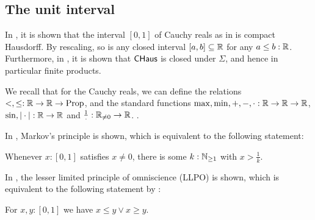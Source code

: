 \subsection{The unit interval}
\begin{example}
  In \parencite[Thm 4.22]{synthetic-stone-duality}, it is shown that the interval $[0,1]$ of Cauchy reals as in \cite{Bishop} is compact Hausdorff. By rescaling, so is any closed interval $[a,b]\subseteq \mathbb{R}$ for any $a\leq b:\mathbb{R}$. Furthermore, in \parencite[Lemma 4.11]{synthetic-stone-duality}, it is shown that $\mathsf{CHaus}$ is closed under $\Sigma$, and hence in particular finite products. 
\end{example}
\begin{remark}\label{CauchyDfns}
  We recall that for the Cauchy reals, we can define the relations $<,\leq : \mathbb{R} \to \mathbb{R} \to \mathrm{Prop}$, and the standard functions 
 $\max,\min,+,-,\cdot : \mathbb{R} \to \mathbb{R} \to \mathbb{R}$,
  $\sin,|\cdot|:\mathbb{R} \to \mathbb{R}$ and 
  $\frac{1}{\cdot}:\mathbb{R}_{\neq 0} \to \mathbb{R}$.
  \parencite[Dfn 2.4, Dfn 2.7,Dfn 2.10, Prop 2.13, p20,p58]{Bishop}.
\end{remark}

  In \parencite[Cor 1.16]{synthetic-stone-duality}, Markov's principle is shown, which is equivalent to the following statement:
\begin{lemma}\label{positiveNumbersCharacter}
  Whenever $x:[0,1]$ satisfies $x\neq 0$, there is some $k:\mathbb{N}_{\geq 1}$ with $x > \frac1k$.
\end{lemma}


  In \parencite[Thm 1.17]{synthetic-stone-duality}, the lesser limited principle of omniscience (LLPO) is shown, which is equivalent to the following statement by \parencite[Prop 1.4.2]{HannesDiener}:
  \begin{lemma}\label{LLPO}
 For $x,y:[0,1]$ we have $x\leq y \vee x \geq y$.
\end{lemma} 

